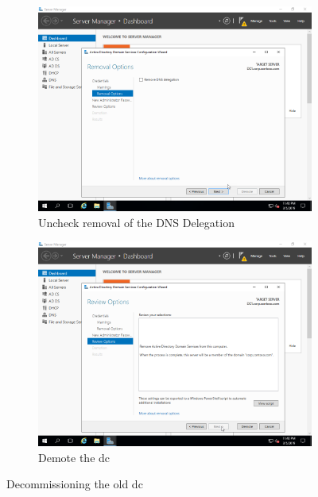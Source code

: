 \begin{figure}[!htb]\ContinuedFloat
	\begin{subfigure}{0.5\textwidth}
		\captionsetup{width=0.8\linewidth}
		\includegraphics[width=0.9\linewidth]{img/Methodologie/Migration33.png}
		\centering
		\caption{Uncheck removal of the DNS Delegation}
	\end{subfigure}
	\begin{subfigure}{0.5\textwidth}
		\captionsetup{width=0.8\linewidth}
		\includegraphics[width=0.9\linewidth]{img/Methodologie/Migration34.png} 
		\centering	
		\caption{Demote the \acrshort{dc}}
	\end{subfigure}
	\caption[Decommissioning the \acrshort{dc}]{Decommissioning the old \acrshort{dc}}
	\label{fig:Decomissioning}
\end{figure}